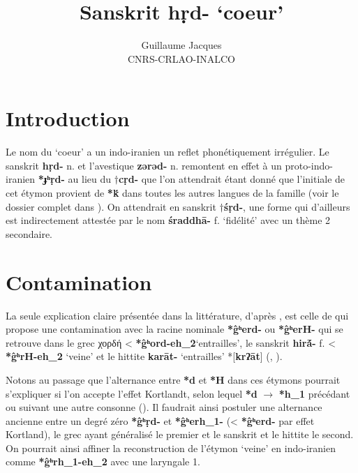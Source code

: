 \documentclass{article}
\newcommand{\ipa}[1]{{\phon\textbf{#1}}}
\newcommand{\grec}[1]{{\mleccha #1}}
\begin{document}
 
\title{Sanskrit \ipa{hṛd-} `coeur'}
\author{Guillaume Jacques\\ CNRS-CRLAO-INALCO}
\maketitle

\section*{Introduction}
Le nom du `coeur' a un indo-iranien un reflet phonétiquement irrégulier. Le sanskrit \ipa{hṛd-} n. et l'avestique \ipa{zərəd-} n. remontent en effet à un proto-indo-iranien \ipa{*ɟʰṛd-} au lieu du $\dagger$\ipa{cṛd-} que l'on attendrait étant donné que l'initiale de cet étymon provient de \ipa{*ḱ} dans toutes les autres langues de la famille (voir le dossier complet dans \citealt[417-423]{wodtko08NIL}). On attendrait en sanskrit $\dagger$\ipa{śṛd-}, une forme qui d'ailleurs est indirectement attestée par le nom \ipa{śraddhā-} f. `fidélité'  avec un thème 2 secondaire.

\section{Contamination} \label{sec:hira}
La seule explication claire présentée dans la littérature, d'après \citet[420]{wodtko08NIL}, est celle de \citet{szemerenyi70heart} qui propose une contamination avec la racine nominale \ipa{*ĝʰerd-} ou \ipa{*ĝʰerH-} qui se retrouve dans le grec \grec{χορδή} < \ipa{*ĝʰord-eh_2}`entrailles', le sanskrit \ipa{hirā́-} f. < \ipa{*ĝʰrH-eh_2} `veine' et le hittite \ipa{karāt-} `entrailles' *[\ipa{krʔāt}] (\citealt[208]{schrijver91laryngeals}, \citealt[446]{kloekhorst08edhil}).

Notons au passage que l'alternance entre \ipa{*d} et \ipa{*H} dans ces étymons pourrait s'expliquer si l'on accepte l'effet Kortlandt, selon lequel \ipa{*d} $\rightarrow$ \ipa{*h_1} précédant ou suivant  une autre consonne (\citealt{kortlandt83numerals, garnier14kortlandt}). Il faudrait ainsi postuler une alternance ancienne entre un degré zéro \ipa{*ĝʰṛd-} et  \ipa{*ĝʰerh_1-} (< \ipa{*ĝʰerd-} par effet Kortland), le grec ayant généralisé le premier et le sanskrit et le hittite le second. On pourrait ainsi affiner la reconstruction de l'étymon `veine' en indo-iranien comme \ipa{*ĝʰrh_1-eh_2} avec une laryngale 1.
\end{document}
